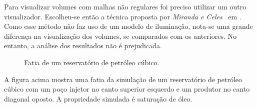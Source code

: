 	Para visualizar volumes com malhas não regulares foi preciso utilizar um outro visualizador. Escolheu-se então a técnica proposta por \textit{Miranda e Celes}~\cite{miranda} em . Como esse método não faz uso de um modelo de iluminação, nota-se uma grande diferença na visualização dos volumes, se comparados com os anteriores. No entanto, a análise dos resultados não é prejudicada.
	
\begin{figure}[h]
	\centering
	\caption{Fatia de um reservatório de petróleo cúbico.}
	\label{fig:box_slice}
\end{figure}

	A figura acima mostra uma fatia da simulação de um reservatório de petróleo cúbico com um poço injetor no canto superior esquerdo e um produtor no canto diagonal oposto. A propriedade simulada é saturação de óleo.

